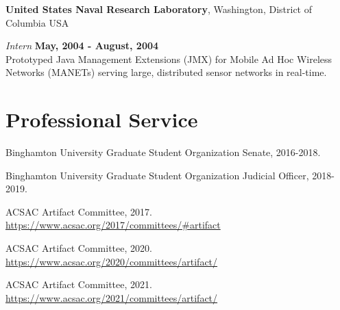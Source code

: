 \documentclass[margin,line]{res}
\begin{document}
\begin{resume}
{\bf United States Naval Research Laboratory}, Washington, District of Columbia USA

\vspace{-.3cm}
{\em Intern} \hfill {\bf May, 2004 - August, 2004}\\
Prototyped Java Management Extensions (JMX) for Mobile Ad Hoc Wireless Networks (MANETs) serving large, distributed sensor networks in real-time.


\section{\sc Professional Service}
\begin{list2}
\item Binghamton University Graduate Student Organization Senate, 2016-2018.
\item Binghamton University Graduate Student Organization Judicial Officer, 2018-2019.
\item ACSAC Artifact Committee, 2017. \url{https://www.acsac.org/2017/committees/#artifact}
\item ACSAC Artifact Committee, 2020. \url{https://www.acsac.org/2020/committees/artifact/}
\item ACSAC Artifact Committee, 2021. \url{https://www.acsac.org/2021/committees/artifact/}
\end{list2}

\end{resume}
\end{document}
